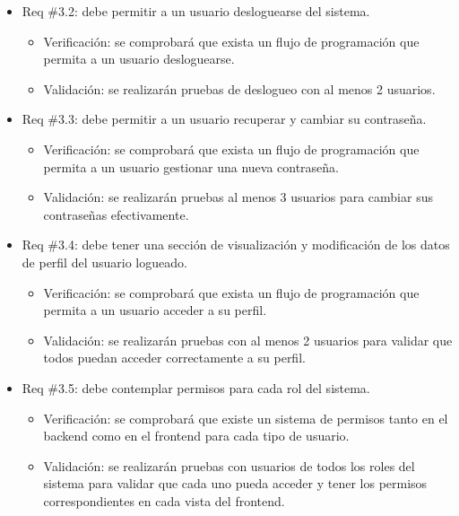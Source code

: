 \documentclass[
11pt, %
codirector, %
]{charter}
\begin{document}
\begin{itemize}
\begin{itemize}
	\item Req \#3.2: debe permitir a un usuario desloguearse del sistema.
		\begin{itemize}
		\item Verificación: se comprobará que exista un flujo de programación que permita a un usuario desloguearse.
		\item Validación: se realizarán pruebas de deslogueo con al menos 2 usuarios.\\
		\end{itemize}
		
	\item Req \#3.3: debe permitir a un usuario recuperar y cambiar su contraseña.
		\begin{itemize}
		\item Verificación: se comprobará que exista un flujo de programación que permita a un usuario gestionar una nueva contraseña.
		\item Validación: se realizarán pruebas al menos 3 usuarios para cambiar sus contraseñas efectivamente.\\
		\end{itemize}
		
	\item Req \#3.4: debe tener una sección de visualización y modificación de los datos de perfil del usuario logueado.
		\begin{itemize}
		\item Verificación: se comprobará que exista un flujo de programación que permita a un usuario acceder a su perfil.
		\item Validación: se realizarán pruebas con al menos 2 usuarios para validar que todos puedan acceder correctamente a su perfil.\\
		\end{itemize}
		
	\item Req \#3.5: debe contemplar permisos para cada rol del sistema.
		\begin{itemize}
		\item Verificación: se comprobará que existe un sistema de permisos tanto en el backend como en el frontend para cada tipo de usuario.
		\item Validación: se realizarán pruebas con usuarios de todos los roles del sistema para validar que cada uno pueda acceder y tener los permisos correspondientes en cada vista del frontend.\\
		\end{itemize}
		

\end{itemize}
\end{itemize}
\end{document}
